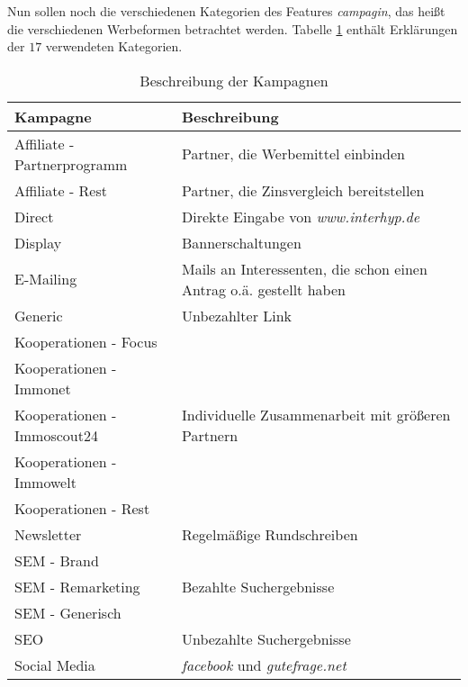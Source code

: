 Nun sollen noch die verschiedenen Kategorien des Features \textit{campagin}, das heißt die verschiedenen Werbeformen betrachtet werden. Tabelle \ref{beschreibungCampaign} enthält Erklärungen der $17$ verwendeten Kategorien.\\
\begin{table}[H]
	\begin{center}
		\begin{tabular}{|l|p{9cm}|}
			\hline \textbf{Kampagne} & \textbf{Beschreibung}\\ \hline
			\hline Affiliate - Partnerprogramm & Partner, die Werbemittel einbinden\\
			\hline Affiliate - Rest & Partner, die Zinsvergleich bereitstellen\\ 
			\hline Direct & Direkte Eingabe von \textit{www.interhyp.de}\\ 
			\hline Display & Bannerschaltungen\\
			\hline E-Mailing & Mails an Interessenten, die schon einen Antrag o.ä. gestellt haben\\
			\hline Generic & Unbezahlter Link\\
			\hline Kooperationen - Focus & \multirow{5}{6cm}{Individuelle Zusammenarbeit mit größeren Partnern}\\
			Kooperationen - Immonet & \\
			Kooperationen - Immoscout24 & \\
			Kooperationen - Immowelt & \\
			Kooperationen - Rest & \\
			\hline Newsletter & Regelmäßige Rundschreiben\\
			\hline SEM - Brand & \multirow{3}{6cm}{Bezahlte Suchergebnisse}\\
			SEM - Remarketing & \\
			SEM - Generisch & \\
			\hline SEO & Unbezahlte Suchergebnisse\\
			\hline Social Media & \textit{facebook} und \textit{gutefrage.net}\\
			\hline
		\end{tabular} 
	\end{center}
	\caption{Beschreibung der Kampagnen}\label{beschreibungCampaign}
\end{table}
